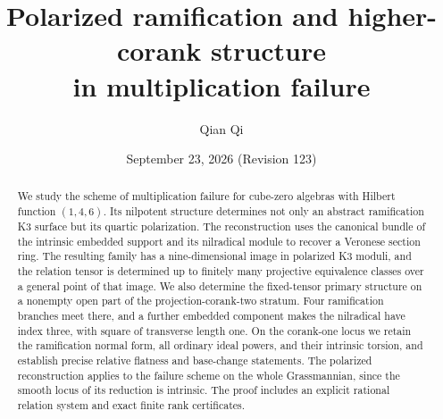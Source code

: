 \title[Polarized ramification and multiplication failure]{Polarized ramification and higher-corank structure\texorpdfstring{\\}{}in multiplication failure}
\author{Qian Qi}
\date{September 23, 2026 \quad (Revision 123)}
\begin{abstract}
We study the scheme of multiplication failure for cube-zero algebras
with Hilbert function $(1,4,6)$. Its nilpotent structure determines not
only an abstract ramification K3 surface but its quartic polarization.
The reconstruction uses the canonical bundle of the intrinsic embedded
support and its nilradical module to recover a Veronese section ring.
The resulting family has a nine-dimensional image in polarized K3
moduli, and the relation tensor is determined up to finitely many
projective equivalence classes over a general point of that image.
We also determine the fixed-tensor primary structure on a nonempty
open part of the projection-corank-two stratum. Four ramification
branches meet there, and a further embedded component makes the
nilradical have index three, with square of transverse length one.
On the corank-one locus we retain the ramification normal form,
all ordinary ideal powers, and their intrinsic torsion, and establish
precise relative flatness and base-change statements. The polarized
reconstruction applies to the failure scheme on the whole Grassmannian,
since the smooth locus of its reduction is intrinsic. The proof includes
an explicit rational relation system and exact finite rank certificates.
\end{abstract}
\maketitle
